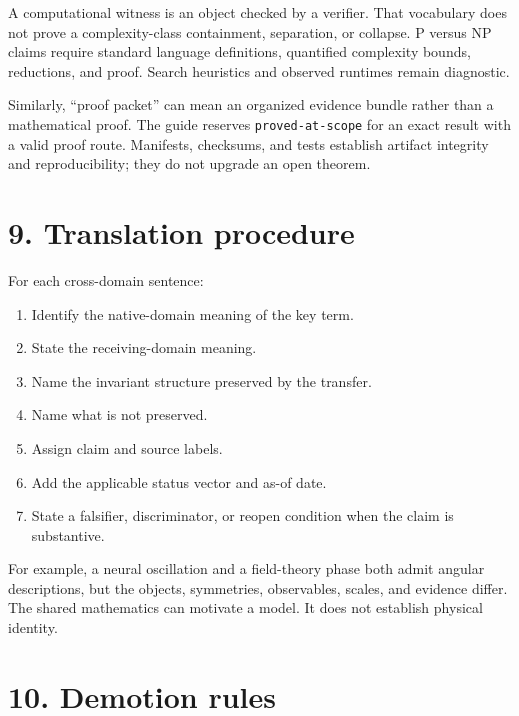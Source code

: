 \documentclass[
  american,
  11pt,
  letterpaper,
]{article}
\providecommand{\tightlist}{%
  \setlength{\itemsep}{0pt}\setlength{\parskip}{0pt}}
\begin{document}
A computational witness is an object checked by a verifier. That vocabulary does not prove a complexity-class containment, separation, or collapse. P versus NP claims require standard language definitions, quantified complexity bounds, reductions, and proof. Search heuristics and observed runtimes remain diagnostic.

Similarly, ``proof packet'' can mean an organized evidence bundle rather than a mathematical proof. The guide reserves \texttt{proved-at-scope} for an exact result with a valid proof route. Manifests, checksums, and tests establish artifact integrity and reproducibility; they do not upgrade an open theorem.

\section{9. Translation procedure}\label{translation-procedure}

For each cross-domain sentence:

\begin{enumerate}
\def\labelenumi{\arabic{enumi}.}
\tightlist
\item
  Identify the native-domain meaning of the key term.
\item
  State the receiving-domain meaning.
\item
  Name the invariant structure preserved by the transfer.
\item
  Name what is not preserved.
\item
  Assign claim and source labels.
\item
  Add the applicable status vector and as-of date.
\item
  State a falsifier, discriminator, or reopen condition when the claim is substantive.
\end{enumerate}

For example, a neural oscillation and a field-theory phase both admit angular descriptions, but the objects, symmetries, observables, scales, and evidence differ. The shared mathematics can motivate a model. It does not establish physical identity.

\section{10. Demotion rules}\label{demotion-rules}
\end{document}
